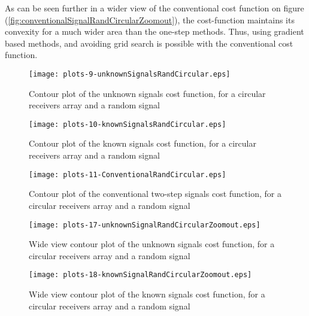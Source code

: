 As can be seen further in a wider view of the conventional cost function on figure (\ref{fig:conventionalSignalRandCircularZoomout}), the cost-function maintains its convexity for a much wider area than the one-step methods.
Thus, using gradient based methods, and avoiding grid search is possible with the conventional cost function.

\begin{figure}
\begin{center}
\texttt{[image: plots-9-unknownSignalsRandCircular.eps]} 
\end{center}
\caption{Contour plot of the unknown signals cost function, for a circular receivers array and a random signal}
\label{fig:unknownSignalsRandCircular}
\end{figure}

\begin{figure}
\begin{center}
\texttt{[image: plots-10-knownSignalsRandCircular.eps]} 
\end{center}
\caption{Contour plot of the known signals cost function, for a circular receivers array and a random signal}
\label{fig:knownSignalsRandCircular}
\end{figure}

\begin{figure}
\begin{center}
\texttt{[image: plots-11-ConventionalRandCircular.eps]} 
\end{center}
\caption{Contour plot of the conventional two-step signals cost function, for a circular receivers array and a random signal}
\label{fig:conventionalRandCircular}
\end{figure}

\begin{figure}
\begin{center}
\texttt{[image: plots-17-unknownSignalRandCircularZoomout.eps]} 
\end{center}
\caption{Wide view contour plot of the unknown signals cost function, for a circular receivers array and a random signal}
\label{fig:unknownSignalRandCircularZoomout}
\end{figure}

\begin{figure}
\begin{center}
\texttt{[image: plots-18-knownSignalRandCircularZoomout.eps]} 
\end{center}
\caption{Wide view contour plot of the known signals cost function, for a circular receivers array and a random signal}
\label{fig:knownSignalRandCircularZoomout}
\end{figure}

